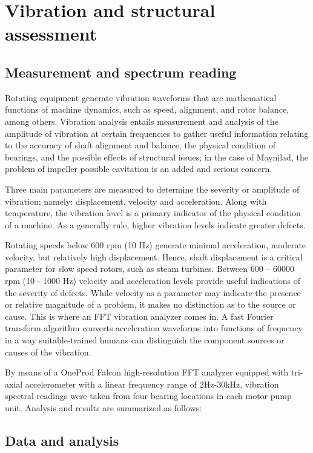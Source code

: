 %
\section{Vibration and structural assessment}
\label{45}

\subsection{Measurement and spectrum reading}
Rotating equipment generate vibration waveforms that are mathematical functions of machine dynamics, such as speed, alignment, and rotor balance, among others. Vibration analysis entails measurement and analysis of the amplitude of vibration at certain frequencies to gather useful information relating to the accuracy of shaft alignment and balance, the physical condition of bearings, and the possible effects of structural issues; in the case of Maynilad, the problem of impeller possible cavitation is an added and serious concern.

Three main parameters are measured to determine the severity or amplitude of vibration; namely: displacement, velocity and acceleration. Along with temperature, the vibration level is a primary indicator of the physical condition of a machine. As a generally rule, higher vibration levels indicate greater defects. 

Rotating speeds below 600 rpm (10 Hz) generate minimal acceleration, moderate velocity, but relatively high displacement. Hence, shaft displacement is a critical parameter for slow speed rotors, such as steam turbines. Between 600 – 60000 rpm (10 - 1000 Hz) velocity and acceleration levels provide useful indications of the severity of defects. While velocity as a parameter may indicate the presence or relative magnitude of a problem, it makes no distinction as to the source or cause. This is where an FFT vibration analyzer comes in. A fast Fourier transform algorithm converts acceleration waveforms into functions of frequency in a way suitable-trained humans can distinguish the component sources or causes of the vibration.

By means of a OneProd Falcon high-resolution FFT analyzer equipped with tri-axial accelerometer with a linear frequency range of 2Hz-30kHz, vibration spectral readings were taken from four bearing locations in each motor-pump unit. Analysis and results are summarized as follows:

\subsection{Data and analysis}

